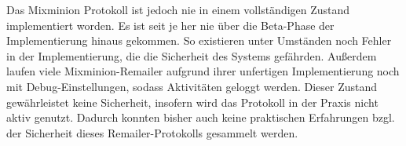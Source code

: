 Das Mixminion Protokoll ist jedoch nie in einem vollständigen Zustand implementiert worden. Es ist seit je her nie über die Beta-Phase der Implementierung hinaus gekommen. So existieren unter Umständen noch Fehler in der Implementierung, die die Sicherheit des Systems gefährden. Außerdem laufen viele Mixminion-Remailer aufgrund ihrer unfertigen Implementierung noch mit Debug-Einstellungen, sodass Aktivitäten geloggt werden. Dieser Zustand gewährleistet keine Sicherheit, insofern wird das Protokoll in der Praxis nicht aktiv genutzt. Dadurch konnten bisher auch keine praktischen Erfahrungen bzgl. der Sicherheit dieses Remailer-Protokolls gesammelt werden.


